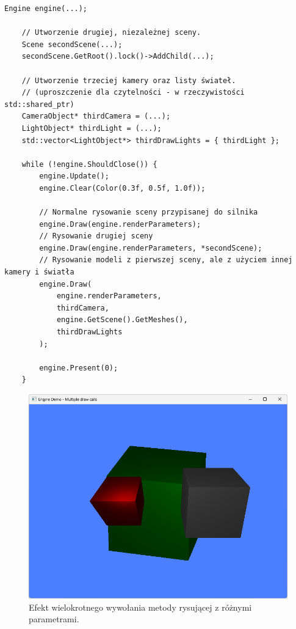 \begin{lstlisting}[caption={Fragmentu kodu dema, pokazujący sposób na ręczne wywoływanie procesu rysowania obiektów z różnymi parametrami.}, label={lst:demo:engine:multipleDrawCalls}]
	Engine engine(...);
	
	// Utworzenie drugiej, niezależnej sceny.
	Scene secondScene(...);
	secondScene.GetRoot().lock()->AddChild(...);
	
	// Utworzenie trzeciej kamery oraz listy świateł.
	// (uproszczenie dla czytelności - w rzeczywistości std::shared_ptr)
	CameraObject* thirdCamera = (...);
	LightObject* thirdLight = (...);
	std::vector<LightObject*> thirdDrawLights = { thirdLight };
	
	while (!engine.ShouldClose()) {
		engine.Update();
		engine.Clear(Color(0.3f, 0.5f, 1.0f));
		
		// Normalne rysowanie sceny przypisanej do silnika
		engine.Draw(engine.renderParameters); 
		// Rysowanie drugiej sceny
		engine.Draw(engine.renderParameters, *secondScene); 
		// Rysowanie modeli z pierwszej sceny, ale z użyciem innej kamery i światła
		engine.Draw(
			engine.renderParameters, 
			thirdCamera, 
			engine.GetScene().GetMeshes(), 
			thirdDrawLights
		);
		
		engine.Present(0);
	}
\end{lstlisting}

\vfill
\clearpage

\begin{figure}[h!]
	\centering
	\includegraphics[width=\textwidth]{images/demo_engine_multiple_draw_calls.png}
	\caption{Efekt wielokrotnego wywołania metody rysującej z różnymi parametrami.}
	\label{demo_engine_multiple_draw_calls}
\end{figure}

